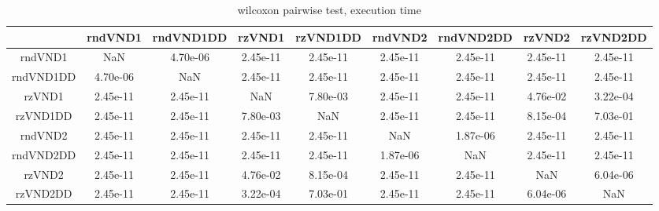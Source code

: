 \documentclass[12pt,a4paper]{article}
\begin{document}
\begin{table}[!h]
\leftskip -1.6cm
{
\footnotesize
\begin{tabular}{|*{9}{c|}}
  \hline
 & rndVND1 & rndVND1DD & rzVND1 & rzVND1DD & rndVND2 & rndVND2DD & rzVND2 & rzVND2DD \\
 \hline
rndVND1 & NaN & 4.70e-06 & 2.45e-11 & 2.45e-11 & 2.45e-11 & 2.45e-11 & 2.45e-11 & 2.45e-11 \\
rndVND1DD & 4.70e-06 & NaN & 2.45e-11 & 2.45e-11 & 2.45e-11 & 2.45e-11 & 2.45e-11 & 2.45e-11 \\
rzVND1 & 2.45e-11 & 2.45e-11 & NaN & 7.80e-03 & 2.45e-11 & 2.45e-11 & 4.76e-02 & 3.22e-04 \\
rzVND1DD & 2.45e-11 & 2.45e-11 & 7.80e-03 & NaN & 2.45e-11 & 2.45e-11 & 8.15e-04 & 7.03e-01 \\
rndVND2 & 2.45e-11 & 2.45e-11 & 2.45e-11 & 2.45e-11 & NaN & 1.87e-06 & 2.45e-11 & 2.45e-11 \\
rndVND2DD & 2.45e-11 & 2.45e-11 & 2.45e-11 & 2.45e-11 & 1.87e-06 & NaN & 2.45e-11 & 2.45e-11 \\
rzVND2 & 2.45e-11 & 2.45e-11 & 4.76e-02 & 8.15e-04 & 2.45e-11 & 2.45e-11 & NaN & 6.04e-06 \\
rzVND2DD & 2.45e-11 & 2.45e-11 & 3.22e-04 & 7.03e-01 & 2.45e-11 & 2.45e-11 & 6.04e-06 & NaN \\
  \hline
\end{tabular}
\normalsize
}
\caption{wilcoxon pairwise test, execution time}
\label{wilcoxon pairwise test VND time}
\end{table} 
\end{document}
